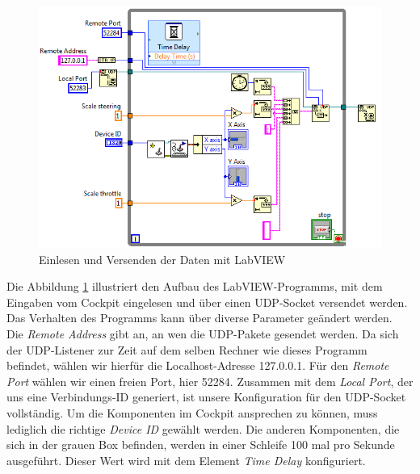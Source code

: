 \newpage 

\begin{figure}[H]
\centering 
\includegraphics[width=1\linewidth]{src/labview_screenshot_videoplayer_daten_senden.png}
\caption{Einlesen und Versenden der Daten mit LabVIEW} %
\label{labview_screenshot_videoplayer_daten_senden} %
\end{figure}
Die Abbildung \ref{labview_screenshot_videoplayer_daten_senden} illustriert den Aufbau des LabVIEW-Programms, mit dem Eingaben vom Cockpit eingelesen und über einen UDP-Socket versendet werden. Das Verhalten des Programms kann über diverse Parameter geändert werden.\\
Die \textit{Remote Address} gibt an, an wen die UDP-Pakete gesendet werden. Da sich der UDP-Listener zur Zeit auf dem selben Rechner wie dieses Programm befindet, wählen wir hierfür die Localhost-Adresse 127.0.0.1. Für den \textit{Remote Port} wählen wir einen freien Port, hier 52284. Zusammen mit dem \textit{Local Port}, der uns eine Verbindungs-ID generiert, ist unsere Konfiguration für den UDP-Socket vollständig. Um die Komponenten im Cockpit ansprechen zu können, muss lediglich die richtige \textit{Device ID} gewählt werden. Die anderen Komponenten, die sich in der grauen Box befinden, werden in einer Schleife 100 mal pro Sekunde ausgeführt. Dieser Wert wird mit dem Element \textit{Time Delay} konfiguriert.\\
